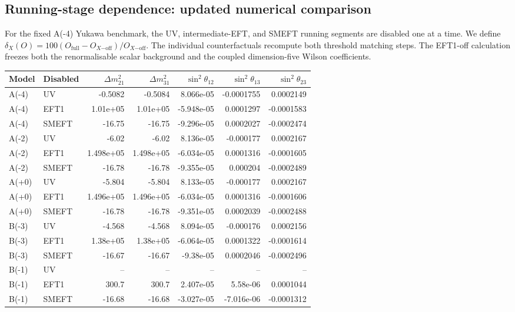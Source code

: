 \subsection*{Running-stage dependence: updated numerical comparison}
For the fixed A(-4) Yukawa benchmark, the
UV, intermediate-EFT, and SMEFT running segments are disabled one at a time.
We define $\delta_X(O)=100(O_{\mathrm{full}}-O_{X\mathrm{-off}})/O_{X\mathrm{-off}}$.
The individual counterfactuals recompute both threshold matching steps.
The EFT1-off calculation freezes both the renormalisable scalar background and
the coupled dimension-five Wilson coefficients.
\begin{table}[htbp]
\centering
\scriptsize
\begin{tabular}{llrrrrr}
\hline
Model & Disabled & $\Delta m^2_{21}$ & $\Delta m^2_{31}$ & $\sin^2\theta_{12}$ & $\sin^2\theta_{13}$ & $\sin^2\theta_{23}$ \\
\hline
A(-4) & UV & -0.5082 & -0.5084 & 8.066e-05 & -0.0001755 & 0.0002149 \\
A(-4) & EFT1 & 1.01e+05 & 1.01e+05 & -5.948e-05 & 0.0001297 & -0.0001583 \\
A(-4) & SMEFT & -16.75 & -16.75 & -9.296e-05 & 0.0002027 & -0.0002474 \\
A(-2) & UV & -6.02 & -6.02 & 8.136e-05 & -0.000177 & 0.0002167 \\
A(-2) & EFT1 & 1.498e+05 & 1.498e+05 & -6.034e-05 & 0.0001316 & -0.0001605 \\
A(-2) & SMEFT & -16.78 & -16.78 & -9.355e-05 & 0.000204 & -0.0002489 \\
A(+0) & UV & -5.804 & -5.804 & 8.133e-05 & -0.000177 & 0.0002167 \\
A(+0) & EFT1 & 1.496e+05 & 1.496e+05 & -6.034e-05 & 0.0001316 & -0.0001606 \\
A(+0) & SMEFT & -16.78 & -16.78 & -9.351e-05 & 0.0002039 & -0.0002488 \\
B(-3) & UV & -4.568 & -4.568 & 8.094e-05 & -0.000176 & 0.0002156 \\
B(-3) & EFT1 & 1.38e+05 & 1.38e+05 & -6.064e-05 & 0.0001322 & -0.0001614 \\
B(-3) & SMEFT & -16.67 & -16.67 & -9.38e-05 & 0.0002046 & -0.0002496 \\
B(-1) & UV & -- & -- & -- & -- & -- \\
B(-1) & EFT1 & 300.7 & 300.7 & 2.407e-05 & 5.58e-06 & 0.0001044 \\
B(-1) & SMEFT & -16.68 & -16.68 & -3.027e-05 & -7.016e-06 & -0.0001312 \\

\end{tabular}
\end{table}
